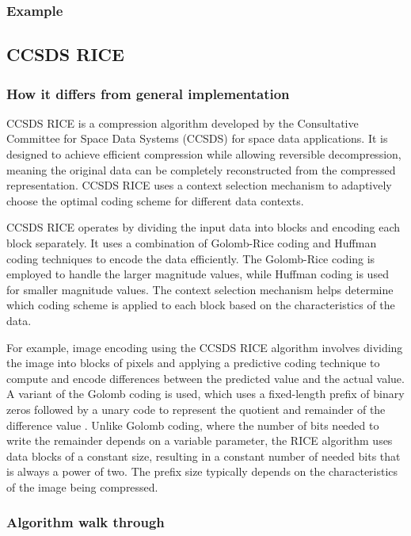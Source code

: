 \documentclass[licencjacka,en]{pracamgr}
\begin{document}
\subsubsection{Example}

\subsection{CCSDS RICE}
\subsubsection{How it differs from general implementation}
CCSDS RICE is a compression algorithm developed by the Consultative Committee for Space Data Systems (CCSDS) for space data applications. It is designed to achieve efficient compression while allowing reversible decompression, meaning the original data can be completely reconstructed from the compressed representation. CCSDS RICE uses a context selection mechanism to adaptively choose the optimal coding scheme for different data contexts.

CCSDS RICE operates by dividing the input data into blocks and encoding each block separately. It uses a combination of Golomb-Rice coding and Huffman coding techniques to encode the data efficiently. The Golomb-Rice coding is employed to handle the larger magnitude values, while Huffman coding is used for smaller magnitude values. The context selection mechanism helps determine which coding scheme is applied to each block based on the characteristics of the data.

For example, image encoding using the CCSDS RICE algorithm involves dividing the image into blocks of pixels and applying a predictive coding technique to compute and encode differences between the predicted value and the actual value. A variant of the Golomb coding is used, which uses a fixed-length prefix of binary zeros followed by a unary code to represent the quotient and remainder of the difference value \cite{rice-codes}. Unlike Golomb coding, where the number of bits needed to write the remainder depends on a variable parameter, the RICE algorithm uses data blocks of a constant size, resulting in a constant number of needed bits that is always a power of two. The prefix size typically depends on the characteristics of the image being compressed.

\subsubsection{Algorithm walk through}
\end{document}
